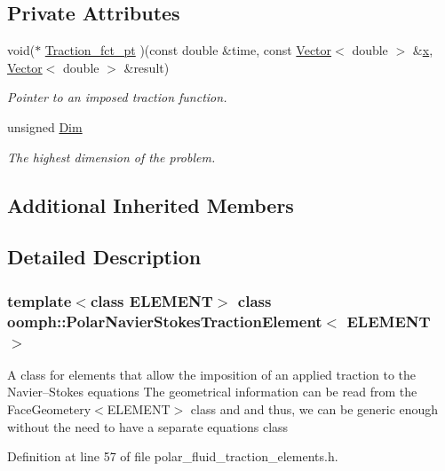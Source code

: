 \subsection*{Private Attributes}
\begin{DoxyCompactItemize}
\item 
void($\ast$ \hyperlink{classoomph_1_1PolarNavierStokesTractionElement_a6ed7d56215a72c40a48ddba355de0fb5}{Traction\+\_\+fct\+\_\+pt} )(const double \&time, const \hyperlink{classoomph_1_1Vector}{Vector}$<$ double $>$ \&\hyperlink{classoomph_1_1PolarNavierStokesTractionElement_a9c89a9bed61686e2fb60717f133f8f02}{x}, \hyperlink{classoomph_1_1Vector}{Vector}$<$ double $>$ \&result)
\begin{DoxyCompactList}\small\item\em Pointer to an imposed traction function. \end{DoxyCompactList}\item 
unsigned \hyperlink{classoomph_1_1PolarNavierStokesTractionElement_a7db691fc3415d54a2a2497a2d0b7aee5}{Dim}
\begin{DoxyCompactList}\small\item\em The highest dimension of the problem. \end{DoxyCompactList}\end{DoxyCompactItemize}
\subsection*{Additional Inherited Members}


\subsection{Detailed Description}
\subsubsection*{template$<$class E\+L\+E\+M\+E\+NT$>$\newline
class oomph\+::\+Polar\+Navier\+Stokes\+Traction\+Element$<$ E\+L\+E\+M\+E\+N\+T $>$}

A class for elements that allow the imposition of an applied traction to the Navier--Stokes equations The geometrical information can be read from the Face\+Geometery$<$\+E\+L\+E\+M\+E\+N\+T$>$ class and and thus, we can be generic enough without the need to have a separate equations class 

Definition at line 57 of file polar\+\_\+fluid\+\_\+traction\+\_\+elements.\+h.



